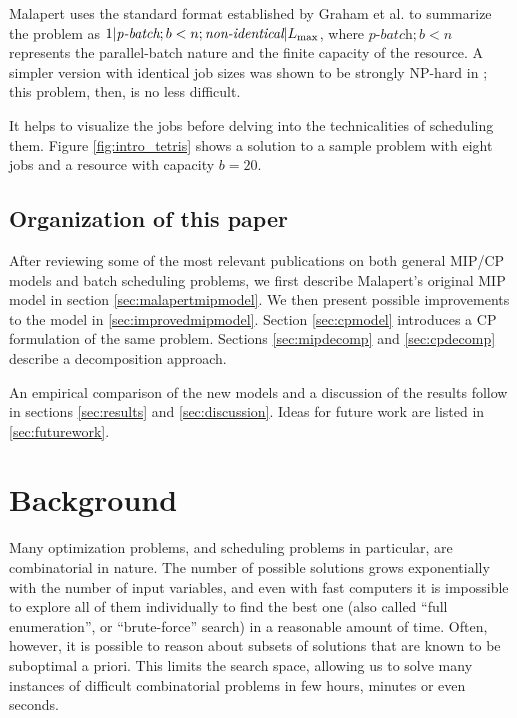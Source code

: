 \documentclass[13pt, letterpaper, oneside]{book}
\begin{document}
Malapert uses the standard format established by Graham et al. to
summarize the problem as $1|\textit{p-batch}; b < n;
\textit{non-identical}|L_{\text{max}}$, where $\textit{p-batch};b<n$ represents the
parallel-batch nature and the finite capacity of the resource. A simpler version
with identical job sizes was shown to be strongly NP-hard in \citep{Brucker};
this problem, then, is no less difficult.

It helps to visualize the jobs before delving into the technicalities of
scheduling them. Figure \ref{fig:intro_tetris} shows a solution to a sample
problem with eight jobs and a resource with capacity $b = 20$.


\section{Organization of this paper}
After reviewing some of the most relevant publications on both general MIP/CP models and
batch scheduling problems, we first describe Malapert's original MIP model in
section \ref{sec:malapertmipmodel}. We then present possible improvements to the
model in \ref{sec:improvedmipmodel}. Section \ref{sec:cpmodel} introduces a CP formulation of the same
problem. Sections \ref{sec:mipdecomp} and \ref{sec:cpdecomp} describe a
decomposition approach.

An empirical comparison of the new models and a discussion of the results follow in
sections \ref{sec:results} and \ref{sec:discussion}. Ideas for future work are
listed in \ref{sec:futurework}.

\chapter{Background}
Many optimization problems, and scheduling problems in particular, are
combinatorial in nature. The number of possible solutions grows exponentially
with the number of input variables, and even with fast computers it is
impossible to explore all of them individually to find the best one
(also called ``full enumeration'', or ``brute-force'' search) in a reasonable
amount of time. Often, however, it is possible to reason about subsets of
solutions that are known to be suboptimal a priori. This limits the search
space, allowing us to solve many instances of difficult combinatorial problems
in few hours, minutes or even seconds.
\end{document}
